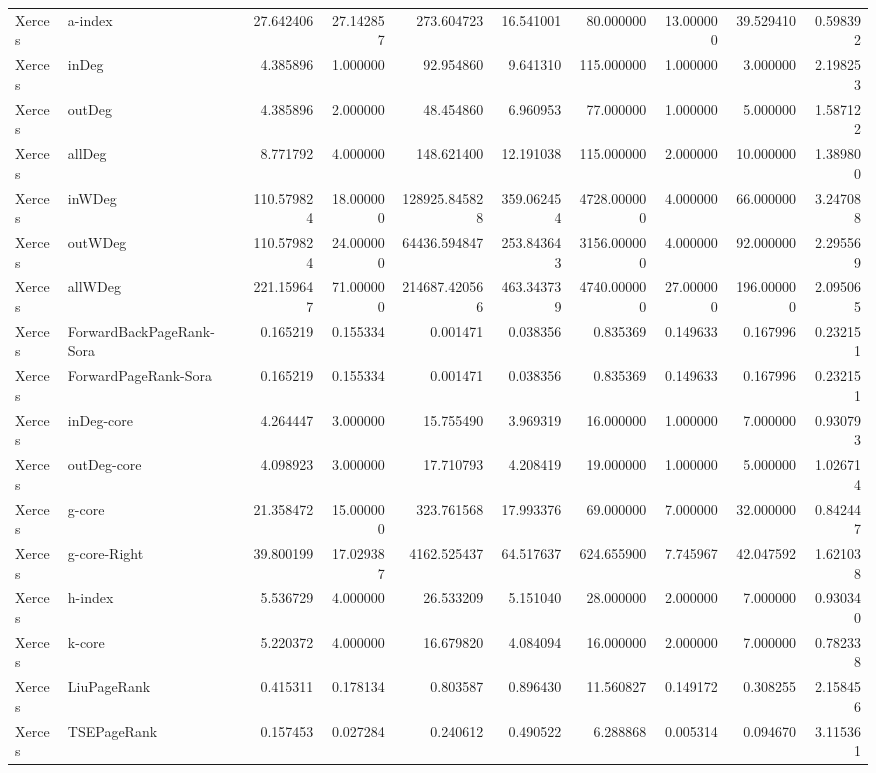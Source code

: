 \begin{tabular}{llrrrrrrrr}
Xerces & a-index & 27.642406 & 27.142857 & 273.604723 & 16.541001 & 80.000000 & 13.000000 & 39.529410 & 0.598392 \\
Xerces & inDeg & 4.385896 & 1.000000 & 92.954860 & 9.641310 & 115.000000 & 1.000000 & 3.000000 & 2.198253 \\
Xerces & outDeg & 4.385896 & 2.000000 & 48.454860 & 6.960953 & 77.000000 & 1.000000 & 5.000000 & 1.587122 \\
Xerces & allDeg & 8.771792 & 4.000000 & 148.621400 & 12.191038 & 115.000000 & 2.000000 & 10.000000 & 1.389800 \\
Xerces & inWDeg & 110.579824 & 18.000000 & 128925.845828 & 359.062454 & 4728.000000 & 4.000000 & 66.000000 & 3.247088 \\
Xerces & outWDeg & 110.579824 & 24.000000 & 64436.594847 & 253.843643 & 3156.000000 & 4.000000 & 92.000000 & 2.295569 \\
Xerces & allWDeg & 221.159647 & 71.000000 & 214687.420566 & 463.343739 & 4740.000000 & 27.000000 & 196.000000 & 2.095065 \\
Xerces & ForwardBackPageRank-Sora & 0.165219 & 0.155334 & 0.001471 & 0.038356 & 0.835369 & 0.149633 & 0.167996 & 0.232151 \\
Xerces & ForwardPageRank-Sora & 0.165219 & 0.155334 & 0.001471 & 0.038356 & 0.835369 & 0.149633 & 0.167996 & 0.232151 \\
Xerces & inDeg-core & 4.264447 & 3.000000 & 15.755490 & 3.969319 & 16.000000 & 1.000000 & 7.000000 & 0.930793 \\
Xerces & outDeg-core & 4.098923 & 3.000000 & 17.710793 & 4.208419 & 19.000000 & 1.000000 & 5.000000 & 1.026714 \\
Xerces & g-core & 21.358472 & 15.000000 & 323.761568 & 17.993376 & 69.000000 & 7.000000 & 32.000000 & 0.842447 \\
Xerces & g-core-Right & 39.800199 & 17.029387 & 4162.525437 & 64.517637 & 624.655900 & 7.745967 & 42.047592 & 1.621038 \\
Xerces & h-index & 5.536729 & 4.000000 & 26.533209 & 5.151040 & 28.000000 & 2.000000 & 7.000000 & 0.930340 \\
Xerces & k-core & 5.220372 & 4.000000 & 16.679820 & 4.084094 & 16.000000 & 2.000000 & 7.000000 & 0.782338 \\
Xerces & LiuPageRank & 0.415311 & 0.178134 & 0.803587 & 0.896430 & 11.560827 & 0.149172 & 0.308255 & 2.158456 \\
Xerces & TSEPageRank & 0.157453 & 0.027284 & 0.240612 & 0.490522 & 6.288868 & 0.005314 & 0.094670 & 3.115361 \\

\end{tabular}
